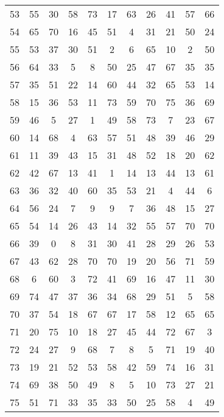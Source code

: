 \begin{table}
\begin{tabular}{c c c c c c c c c c c }
53 & 55 & 30 & 58 & 73 & 17 & 63 & 26 & 41 & 57 & 66 \\
54 & 65 & 70 & 16 & 45 & 51 & 4 & 31 & 21 & 50 & 24 \\
55 & 53 & 37 & 30 & 51 & 2 & 6 & 65 & 10 & 2 & 50 \\
56 & 64 & 33 & 5 & 8 & 50 & 25 & 47 & 67 & 35 & 35 \\
57 & 35 & 51 & 22 & 14 & 60 & 44 & 32 & 65 & 53 & 14 \\
58 & 15 & 36 & 53 & 11 & 73 & 59 & 70 & 75 & 36 & 69 \\
59 & 46 & 5 & 27 & 1 & 49 & 58 & 73 & 7 & 23 & 67 \\
60 & 14 & 68 & 4 & 63 & 57 & 51 & 48 & 39 & 46 & 29 \\
61 & 11 & 39 & 43 & 15 & 31 & 48 & 52 & 18 & 20 & 62 \\
62 & 42 & 67 & 13 & 41 & 1 & 14 & 13 & 44 & 13 & 61 \\
63 & 36 & 32 & 40 & 60 & 35 & 53 & 21 & 4 & 44 & 6 \\
64 & 56 & 24 & 7 & 9 & 9 & 7 & 36 & 48 & 15 & 27 \\
65 & 54 & 14 & 26 & 43 & 14 & 32 & 55 & 57 & 70 & 70 \\
66 & 39 & 0 & 8 & 31 & 30 & 41 & 28 & 29 & 26 & 53 \\
67 & 43 & 62 & 28 & 70 & 70 & 19 & 20 & 56 & 71 & 59 \\
68 & 6 & 60 & 3 & 72 & 41 & 69 & 16 & 47 & 11 & 30 \\
69 & 74 & 47 & 37 & 36 & 34 & 68 & 29 & 51 & 5 & 58 \\
70 & 37 & 54 & 18 & 67 & 67 & 17 & 58 & 12 & 65 & 65 \\
71 & 20 & 75 & 10 & 18 & 27 & 45 & 44 & 72 & 67 & 3 \\
72 & 24 & 27 & 9 & 68 & 7 & 8 & 5 & 71 & 19 & 40 \\
73 & 19 & 21 & 52 & 53 & 58 & 42 & 59 & 74 & 16 & 31 \\
74 & 69 & 38 & 50 & 49 & 8 & 5 & 10 & 73 & 27 & 21 \\
75 & 51 & 71 & 33 & 35 & 33 & 50 & 25 & 58 & 4 & 49 \\
\hline
\end{tabular}
\end{table}